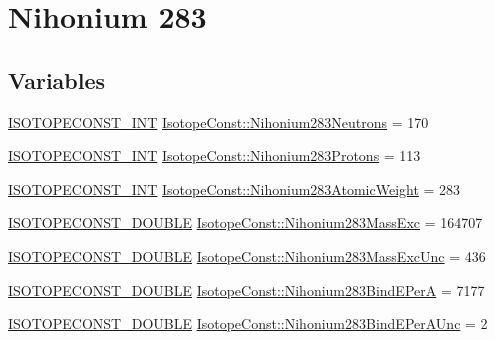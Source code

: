 \hypertarget{group___isotope_const-_nihonium-_nh283}{}\section{Nihonium 283}
\label{group___isotope_const-_nihonium-_nh283}
\subsection*{Variables}
\begin{DoxyCompactItemize}
\item 
\mbox{\hyperlink{group___isotope_const-_macros_ga5f18360b3e99483a35c32d789e62621c}{I\+S\+O\+T\+O\+P\+E\+C\+O\+N\+S\+T\+\_\+\+I\+NT}} \mbox{\hyperlink{group___isotope_const-_nihonium-_nh283_ga648414256dc1cce66fe58f32abdc3eb2}{Isotope\+Const\+::\+Nihonium283\+Neutrons}} = 170
\item 
\mbox{\hyperlink{group___isotope_const-_macros_ga5f18360b3e99483a35c32d789e62621c}{I\+S\+O\+T\+O\+P\+E\+C\+O\+N\+S\+T\+\_\+\+I\+NT}} \mbox{\hyperlink{group___isotope_const-_nihonium-_nh283_gab8a3077e42bb29a1b267cb89b83074bd}{Isotope\+Const\+::\+Nihonium283\+Protons}} = 113
\item 
\mbox{\hyperlink{group___isotope_const-_macros_ga5f18360b3e99483a35c32d789e62621c}{I\+S\+O\+T\+O\+P\+E\+C\+O\+N\+S\+T\+\_\+\+I\+NT}} \mbox{\hyperlink{group___isotope_const-_nihonium-_nh283_gaf457f97ce9e7894248d4d7cb2968a164}{Isotope\+Const\+::\+Nihonium283\+Atomic\+Weight}} = 283
\item 
\mbox{\hyperlink{group___isotope_const-_macros_ga8f45a7272ce02c0b4c65c44636ed719a}{I\+S\+O\+T\+O\+P\+E\+C\+O\+N\+S\+T\+\_\+\+D\+O\+U\+B\+LE}} \mbox{\hyperlink{group___isotope_const-_nihonium-_nh283_ga438ef7d9a22d80516a2df3ab568bd98f}{Isotope\+Const\+::\+Nihonium283\+Mass\+Exc}} = 164707
\item 
\mbox{\hyperlink{group___isotope_const-_macros_ga8f45a7272ce02c0b4c65c44636ed719a}{I\+S\+O\+T\+O\+P\+E\+C\+O\+N\+S\+T\+\_\+\+D\+O\+U\+B\+LE}} \mbox{\hyperlink{group___isotope_const-_nihonium-_nh283_ga75bef5f770cf0f3efb40264353dc534b}{Isotope\+Const\+::\+Nihonium283\+Mass\+Exc\+Unc}} = 436
\item 
\mbox{\hyperlink{group___isotope_const-_macros_ga8f45a7272ce02c0b4c65c44636ed719a}{I\+S\+O\+T\+O\+P\+E\+C\+O\+N\+S\+T\+\_\+\+D\+O\+U\+B\+LE}} \mbox{\hyperlink{group___isotope_const-_nihonium-_nh283_gad82c700a34e58f5ef88e10ed1a7d1dbb}{Isotope\+Const\+::\+Nihonium283\+Bind\+E\+PerA}} = 7177
\item 
\mbox{\hyperlink{group___isotope_const-_macros_ga8f45a7272ce02c0b4c65c44636ed719a}{I\+S\+O\+T\+O\+P\+E\+C\+O\+N\+S\+T\+\_\+\+D\+O\+U\+B\+LE}} \mbox{\hyperlink{group___isotope_const-_nihonium-_nh283_gac424d79895de02ecece956b3d6601d09}{Isotope\+Const\+::\+Nihonium283\+Bind\+E\+Per\+A\+Unc}} = 2

\end{DoxyCompactItemize}
